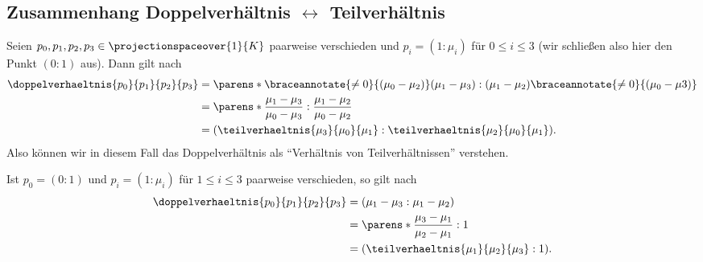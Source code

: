 \subsection*{Zusammenhang Doppelverhältnis \( \leftrightarrow \) Teilverhältnis}
Seien \( p_0,p_1,p_2,p_3\in \projectionspaceover{1}{K} \) paarweise
verschieden und \( p_i=(1:\mu_i) \) für \( 0\leq i\leq 3 \) (wir schließen also hier den Punkt \( (0:1) \) aus). Dann gilt nach 
\begin{align*}
  \doppelverhaeltnis{p_0}{p_1}{p_2}{p_3}&=\parens*{\braceannotate{\neq 0}{(\mu_0-\mu_2)}(\mu_1-\mu_3):(\mu_1-\mu_2)\braceannotate{\neq 0}{(\mu_0-\mu3)}}\\
  &=\parens*{\frac{\mu_1-\mu_3}{\mu_0-\mu_3}:\frac{\mu_1-\mu_2}{\mu_0-\mu_2}}\\
  &=(\teilverhaeltnis{\mu_3}{\mu_0}{\mu_1}:\teilverhaeltnis{\mu_2}{\mu_0}{\mu_1}).
\end{align*}
Also können wir in diesem Fall das Doppelverhältnis als \enquote{Verhältnis von Teilverhältnissen} verstehen.
\begin{bemerkungen*}
  Ist \( p_0=(0:1) \) und \( p_i=(1:\mu_i) \) für \( 1\leq i\leq 3 \) paarweise verschieden, so gilt nach 
  \begin{align*}
    \doppelverhaeltnis{p_0}{p_1}{p_2}{p_3}&=(\mu_1-\mu_3:\mu_1-\mu_2)\\
    &=\parens*{\frac{\mu_3-\mu_1}{\mu_2-\mu_1}:1}\\
    &=(\teilverhaeltnis{\mu_1}{\mu_2}{\mu_3}:1).
  \end{align*}
\end{bemerkungen*}